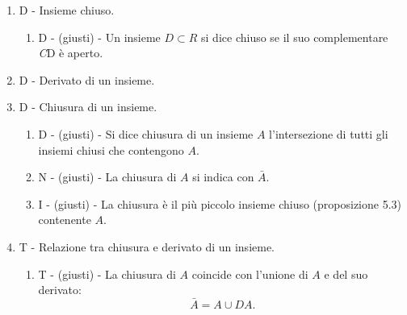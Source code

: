 \documentclass[]{article}
\begin{document}
\begin{enumerate}
\begin{enumerate}
	  \item E - Let $R$ Reals \\
	            Let $A \in R$
	  \item Q - Che succede se $A = R$? $A$ \`e aperto o chiuso? Se $A$ \`e chiuso qual'\`e un elemento che non ha un intorno totalmente contenuto in $R$? $+\infty$ e $-\infty$ hanno un intorno? Chi \`e?
	\end{enumerate}
  \item D - Insieme chiuso.
	\begin{enumerate}
	  \item D - (giusti) - Un insieme $D \subset R$ si dice chiuso se il suo complementare \textit{C}D \`e aperto.
	\end{enumerate}
  \item D - Derivato di un insieme.
  \item D - Chiusura di un insieme.
	\begin{enumerate}
	  \item D - (giusti) - Si dice chiusura di un insieme $A$ l'intersezione di tutti gli insiemi chiusi che contengono $A$.
	  \item N - (giusti) - La chiusura di $A$ si indica con $\bar{A}$.
	  \item I - (giusti) - La chiusura \`e il pi\`u piccolo insieme chiuso (proposizione 5.3) contenente $A$.
	\end{enumerate}
  \item T - Relazione tra chiusura e derivato di un insieme.
	\begin{enumerate}
	  \item T - (giusti) - La chiusura di $A$ coincide con l'unione di $A$ e del suo derivato:
		\[
		      \bar{A} = A \cup \textit{D}A.
		\]
	\end{enumerate}
\end{enumerate}

\end{document}
